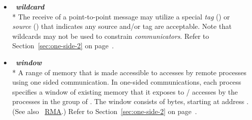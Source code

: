 \begin{itemize}
\label{glossary:wildcard}
\item  ~\hypertarget{glossary:wildcard}{\emph{\textbf{wildcard}}} \\*
The receive of a point-to-point message may utilize
a special \emph{tag} () 
or \emph{source} () that
indicates any source and/or tag are acceptable.  Note that
wildcards may not be used to constrain \emph{communicators}.
Refer to Section~\ref{sec:one-side-2} on page~\pageref{sec:one-side-2}.

\label{glossary:window}
\item  ~\hypertarget{glossary:window}{\emph{\textbf{window}}} \\*
A range of memory that is made accessible to accesses by remote 
processes using one sided communication. 
In one-sided communications, each process specifies
a window of existing memory that it exposes to \RMA/ accesses by the
processes in the group of  .
The window consists of  bytes,
starting at address .
(See also ~\hyperlink{glossary:RMA}{RMA}.)
Refer to Section~\ref{sec:one-side-2} on page~\pageref{sec:one-side-2}.


\end{itemize}